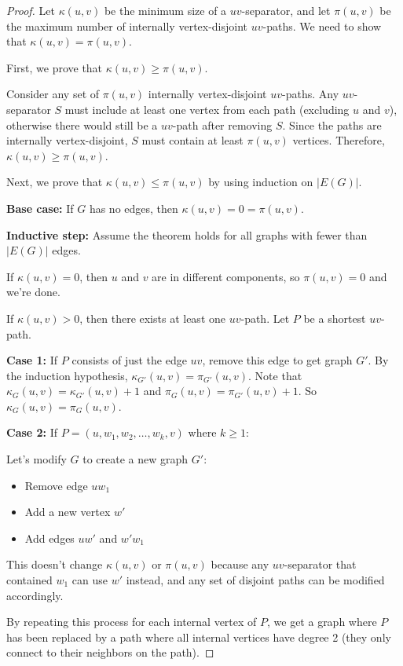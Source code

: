 \documentclass{article}
\theoremstyle{definition}
\begin{document}
\begin{proof}
Let $\kappa(u,v)$ be the minimum size of a $uv$-separator, and let $\pi(u,v)$ be the maximum number of internally vertex-disjoint $uv$-paths. We need to show that $\kappa(u,v) = \pi(u,v)$.

First, we prove that $\kappa(u,v) \geq \pi(u,v)$. 

Consider any set of $\pi(u,v)$ internally vertex-disjoint $uv$-paths. Any $uv$-separator $S$ must include at least one vertex from each path (excluding $u$ and $v$), otherwise there would still be a $uv$-path after removing $S$. Since the paths are internally vertex-disjoint, $S$ must contain at least $\pi(u,v)$ vertices. Therefore, $\kappa(u,v) \geq \pi(u,v)$.

Next, we prove that $\kappa(u,v) \leq \pi(u,v)$ by using induction on $|E(G)|$.

\textbf{Base case:} If $G$ has no edges, then $\kappa(u,v) = 0 = \pi(u,v)$.

\textbf{Inductive step:} Assume the theorem holds for all graphs with fewer than $|E(G)|$ edges.

If $\kappa(u,v) = 0$, then $u$ and $v$ are in different components, so $\pi(u,v) = 0$ and we're done.

If $\kappa(u,v) > 0$, then there exists at least one $uv$-path. Let $P$ be a shortest $uv$-path.

\textbf{Case 1:} If $P$ consists of just the edge $uv$, remove this edge to get graph $G'$. 
By the induction hypothesis, $\kappa_{G'}(u,v) = \pi_{G'}(u,v)$. 
Note that $\kappa_G(u,v) = \kappa_{G'}(u,v) + 1$ and $\pi_G(u,v) = \pi_{G'}(u,v) + 1$.
So $\kappa_G(u,v) = \pi_G(u,v)$.

\textbf{Case 2:} If $P = (u, w_1, w_2, \ldots, w_k, v)$ where $k \geq 1$:

Let's modify $G$ to create a new graph $G'$:
\begin{itemize}
    \item Remove edge $uw_1$
    \item Add a new vertex $w'$
    \item Add edges $uw'$ and $w'w_1$
\end{itemize}

This doesn't change $\kappa(u,v)$ or $\pi(u,v)$ because any $uv$-separator that contained $w_1$ can use $w'$ instead, and any set of disjoint paths can be modified accordingly.

By repeating this process for each internal vertex of $P$, we get a graph where $P$ has been replaced by a path where all internal vertices have degree 2 (they only connect to their neighbors on the path).


\end{proof}
\end{document}
